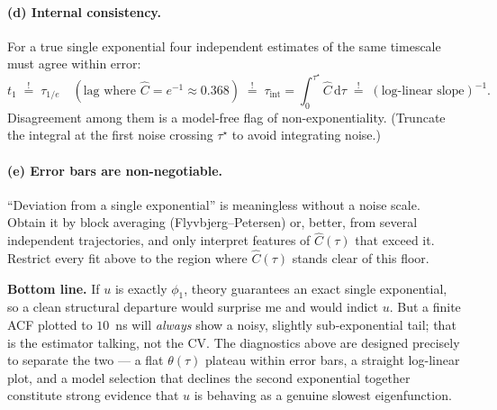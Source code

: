 \documentclass[11pt]{article}
\theoremstyle{plain}
\theoremstyle{definition}
\begin{document}
\paragraph{(d) Internal consistency.} For a true single exponential four independent
estimates of the same timescale must agree within error:
\begin{equation}
t_1 \;\overset{!}{=}\; \tau_{1/e}\quad(\text{lag where }\widehat C=e^{-1}\approx0.368)
\;\overset{!}{=}\; \tau_{\mathrm{int}}=\!\int_0^{\tau^\star}\!\widehat C\,\mathrm d\tau
\;\overset{!}{=}\; (\text{log-linear slope})^{-1}.
\end{equation}
Disagreement among them is a model-free flag of non-exponentiality. (Truncate the
integral at the first noise crossing $\tau^\star$ to avoid integrating noise.)

\paragraph{(e) Error bars are non-negotiable.} ``Deviation from a single
exponential'' is meaningless without a noise scale. Obtain it by block averaging
(Flyvbjerg--Petersen) or, better, from several independent trajectories, and only
interpret features of $\widehat C(\tau)$ that exceed it. Restrict every fit above to
the region where $\widehat C(\tau)$ stands clear of this floor.

\medskip
\noindent\textbf{Bottom line.} If $u$ is exactly $\phi_1$, theory guarantees an exact
single exponential, so a clean structural departure would surprise me and would
indict $u$. But a finite ACF plotted to $10$~ns will \emph{always} show a noisy,
slightly sub-exponential tail; that is the estimator talking, not the CV. The
diagnostics above are designed precisely to separate the two --- a flat
$\theta(\tau)$ plateau within error bars, a straight log-linear plot, and a model
selection that declines the second exponential together constitute strong evidence
that $u$ is behaving as a genuine slowest eigenfunction.
\end{document}
